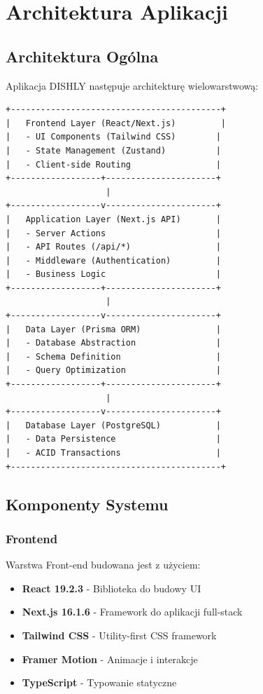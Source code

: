 ﻿\documentclass[12pt,a4paper,utf-8]{article}
\begin{document}
\newpage

\section{Architektura Aplikacji}

\subsection{Architektura Ogólna}

Aplikacja DISHLY następuje architekturę wielowarstwową:

\begin{verbatim}
+------------------------------------------+
|   Frontend Layer (React/Next.js)         |
|   - UI Components (Tailwind CSS)        |
|   - State Management (Zustand)          |
|   - Client-side Routing                 |
+------------------+----------------------+
                    |
+------------------v----------------------+
|   Application Layer (Next.js API)       |
|   - Server Actions                      |
|   - API Routes (/api/*)                 |
|   - Middleware (Authentication)         |
|   - Business Logic                      |
+------------------+----------------------+
                    |
+------------------v----------------------+
|   Data Layer (Prisma ORM)               |
|   - Database Abstraction                |
|   - Schema Definition                   |
|   - Query Optimization                  |
+------------------+----------------------+
                    |
+------------------v----------------------+
|   Database Layer (PostgreSQL)           |
|   - Data Persistence                    |
|   - ACID Transactions                   |
+------------------------------------------+
\end{verbatim}

\subsection{Komponenty Systemu}

\subsubsection{Frontend}

Warstwa Front-end budowana jest z użyciem:
\begin{itemize}
    \item \textbf{React 19.2.3}  -  Biblioteka do budowy UI
    \item \textbf{Next.js 16.1.6}  -  Framework do aplikacji full-stack
    \item \textbf{Tailwind CSS}  -  Utility-first CSS framework
    \item \textbf{Framer Motion}  -  Animacje i interakcje
    \item \textbf{TypeScript}  -  Typowanie statyczne
\end{itemize}
\end{document}
